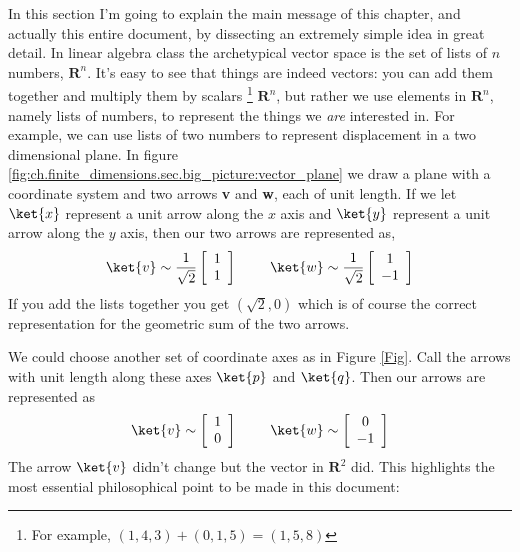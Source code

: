 In this section I'm going to explain the main message of this chapter, and actually this entire document, by dissecting an extremely simple idea in great detail.
In linear algebra class the archetypical vector space is the set of lists of $n$ numbers, $\textbf{R}^n$.
It's easy to see that things are indeed vectors: you can add them together and multiply them by scalars \footnote{For example, $(1,4,3)+(0,1,5)=(1,5,8)$}  $\textbf{R}^n$, but rather we use elements in $\textbf{R}^n$, namely lists of numbers, to represent the things we \emph{are} interested in.
For example, we can use lists of two numbers to represent displacement in a two dimensional plane.
In figure \ref{fig:ch.finite_dimensions.sec.big_picture:vector_plane} we draw a plane with a coordinate system and two arrows \textbf{v} and \textbf{w}, each of unit length.
If we let $\ket{x}$ represent a unit arrow along the $x$ axis and $\ket{y}$ represent a unit arrow along the $y$ axis, then our two arrows are represented as,
\begin{equation}
\ket{v} \sim \frac{1}{\sqrt{2}} \left[ \begin{array}{c} 1 \\ 1 \end{array} \right] \
\qquad \ket{w} \sim \frac{1}{\sqrt{2}} \left[ \begin{array}{c} 1 \\ -1 \end{array} \right]
\end{equation}
If you add the lists together you get $(\sqrt{2},0)$ which is of course the correct representation for the geometric sum of the two arrows.

We could choose another set of coordinate axes as in Figure \ref{Fig}.
Call the arrows with unit length along these axes $\ket{p}$ and $\ket{q}$.
Then our arrows are represented as
\begin{displaymath}
\ket{v}\sim \left[\begin{array}{c} 1 \\ 0 \end{array} \right] \qquad \
\ket{w}\sim \left[\begin{array}{c} 0 \\ -1 \end{array} \right]
\end{displaymath}
The arrow $\ket{v}$ didn't change but the vector in $\textbf{R}^2$ did.
This highlights the most essential philosophical point to be made in this document: 

